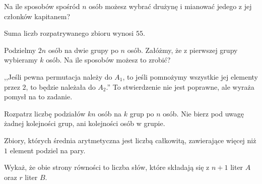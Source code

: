 
\begin{hints_list}
	\item Na ile sposobów spośród $n$ osób możesz wybrać drużynę i mianować jedego z jej członków kapitanem?
	\item Suma liczb rozpatrywanego zbioru wynosi $55$.
	\item Podzielmy $2n$ osób na dwie grupy po $n$ osób. Załóżmy, że z pierwszej grupy wybieramy $k$ osób. Na ile sposobów możesz to zrobić?
	\item ,,Jeśli pewna permutacja należy do $A_1$, to jeśli pomnożymy wszystkie jej elementy przez $2$, to będzie należała do $A_2$.'' To stwierdzenie nie jest poprawne, ale wyraża pomysł na to zadanie.
	\item Rozpatrz liczbę podziałów $kn$ osób na $k$ grup po $n$ osób. Nie bierz pod uwagę żadnej kolejności grup, ani kolejności osób w grupie. 
	\item Zbiory, których średnia arytmetyczna jest liczbą całkowitą, zawierające więcej niż $1$ element podziel na pary.
	\item Wykaż, że obie strony równości to liczba słów, które składają się z $n + 1$ liter $A$ oraz $r$ liter $B$.
\end{hints_list}
